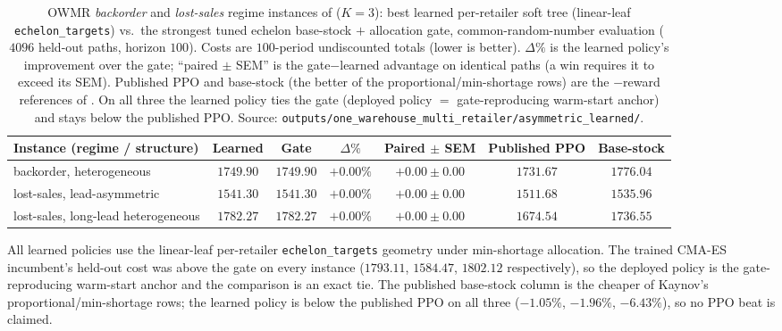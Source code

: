 \begin{table}[!htbp]
\centering
\small
\caption{OWMR \emph{backorder} and \emph{lost-sales} regime instances of
\citet{kaynov2024owmr} ($K{=}3$): best learned per-retailer soft tree (linear-leaf
\texttt{echelon\_targets}) vs.\ the strongest tuned echelon base-stock $+$ allocation gate,
common-random-number evaluation ($4096$ held-out paths, horizon $100$). Costs are
$100$-period undiscounted totals (lower is better). $\Delta\%$ is the learned policy's
improvement over the gate; ``paired $\pm$ SEM'' is the gate$-$learned advantage on identical
paths (a win requires it to exceed its SEM). Published PPO and base-stock (the better of the
proportional/min-shortage rows) are the $-$reward references of \citet{kaynov2024owmr}. On all
three the learned policy ties the gate (deployed policy $=$ gate-reproducing warm-start
anchor) and stays below the published PPO. Source:
\texttt{outputs/one\_warehouse\_multi\_retailer/asymmetric\_learned/}.}
\label{tab:owmr-results-regimes}
\begin{tabular}{lcccccc}
\toprule
Instance (regime / structure) & Learned & Gate & $\Delta\%$ & Paired $\pm$ SEM & Published PPO & Base-stock \\
\midrule
backorder, heterogeneous           & $1749.90$ & $1749.90$ & $+0.00\%$ & $+0.00\pm0.00$ & $1731.67$ & $1776.04$ \\
lost-sales, lead-asymmetric        & $1541.30$ & $1541.30$ & $+0.00\%$ & $+0.00\pm0.00$ & $1511.68$ & $1535.96$ \\
lost-sales, long-lead heterogeneous & $1782.27$ & $1782.27$ & $+0.00\%$ & $+0.00\pm0.00$ & $1674.54$ & $1736.55$ \\
\bottomrule
\end{tabular}
\par\medskip\footnotesize All learned policies use the linear-leaf per-retailer
\texttt{echelon\_targets} geometry under min-shortage allocation. The trained CMA-ES
incumbent's held-out cost was above the gate on every instance ($1793.11$, $1584.47$,
$1802.12$ respectively), so the deployed policy is the gate-reproducing warm-start anchor and
the comparison is an exact tie. The published base-stock column is the cheaper of Kaynov's
proportional/min-shortage rows; the learned policy is below the published PPO on all three
($-1.05\%$, $-1.96\%$, $-6.43\%$), so no PPO beat is claimed.
\end{table}
\FloatBarrier
